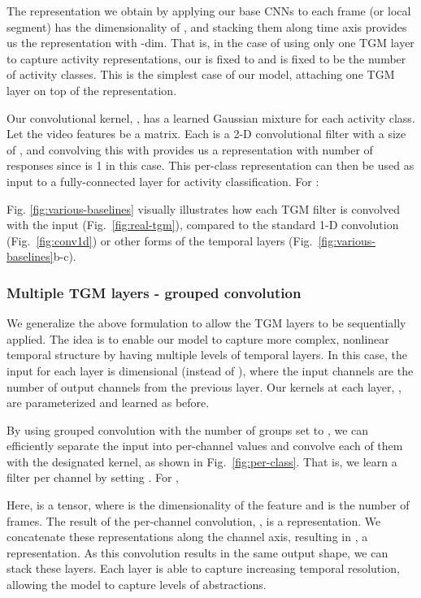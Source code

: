 \documentclass{article}
\begin{document}
The representation we obtain by applying our base CNNs to each frame (or local segment) has the dimensionality of , and stacking them along time axis provides us the representation with -dim. That is, in the case of using only one TGM layer to capture activity representations, our  is fixed to  and  is fixed to be the number of activity classes. This is the simplest case of our model, attaching one TGM layer on top of the  representation.

Our convolutional kernel, , has a learned Gaussian mixture for each activity class. Let the video features  be a  matrix. Each  is a 2-D convolutional filter with a size of , and convolving this with  provides us a representation  with  number of  responses since  is 1 in this case.
This per-class representation can then be used as input to a fully-connected layer for activity classification. For :

Fig. \ref{fig:various-baselines} visually illustrates how each TGM filter is convolved with the input (Fig.~\ref{fig:real-tgm}), compared to the standard 1-D convolution (Fig.~\ref{fig:conv1d}) or other forms of the temporal layers (Fig.~\ref{fig:various-baselines}b-c).


\subsubsection{Multiple TGM layers - grouped convolution}

We generalize the above formulation to allow the TGM layers to be sequentially applied. The idea is to enable our model to capture more complex, nonlinear temporal structure by having multiple levels of temporal layers. In this case, the input for each layer is  dimensional (instead of ), where the input channels are the number of output channels from the previous layer. Our kernels at each layer, , are parameterized and learned as before. 


By using grouped convolution with the number of groups set to , we can efficiently separate the input into per-channel values and convolve each of them with the designated  kernel, as shown in Fig.~\ref{fig:per-class}. That is, we learn a filter  per channel by setting . For ,


Here,  is a  tensor, where  is the dimensionality of the feature and  is the number of frames. The result of the per-channel convolution, , is a  representation. We concatenate these representations along the channel axis, resulting in , a  representation. As this convolution results in the same output shape, we can stack these layers. Each layer is able to capture increasing temporal resolution, allowing the model to capture levels of abstractions.
\end{document}
